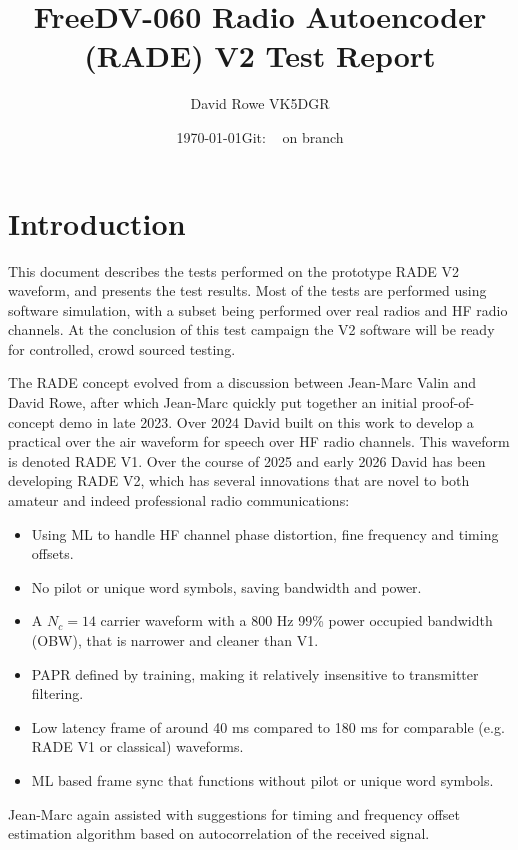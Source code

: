 \documentclass{article}
\newcommand{\commit}{\dots~(in \emph{packed-refs})}}
\newcommand{\gitrevision}{%
  \StrLeft{\commit}{7}%
}
\begin{document}


\title{FreeDV-060 Radio Autoencoder (RADE) V2 Test Report}
\author{David Rowe VK5DGR}
\date{\today \quad Git: \texttt{\gitrevision} on branch \texttt{\branch}\\}
\maketitle

\section{Introduction}

This document describes the tests performed on the prototype RADE V2 waveform, and presents the test results.  Most of the tests are performed using software simulation, with a subset being performed over real radios and HF radio channels.  At the conclusion of this test campaign the V2 software will be ready for controlled, crowd sourced testing.

The RADE concept evolved from a discussion between Jean-Marc Valin and David Rowe, after which Jean-Marc quickly put together an initial proof-of-concept demo in late 2023. Over 2024 David built on this work to develop a practical over the air waveform for speech over HF radio channels. This waveform is denoted RADE V1. 
Over the course of 2025 and early 2026 David has been developing RADE V2, which has several innovations that are novel to both amateur and indeed professional radio communications:
\begin{itemize}
\item Using ML to handle HF channel phase distortion, fine frequency and timing offsets.
\item No pilot or unique word symbols, saving bandwidth and power.
\item A $N_c=14$ carrier waveform with a 800 \si{Hz} 99\% power occupied bandwidth (OBW), that is narrower and cleaner than V1.
\item PAPR defined by training, making it relatively insensitive to transmitter filtering.
\item Low latency frame of around 40 \si{ms} compared to 180 \si{ms} for comparable (e.g. RADE V1 or classical) waveforms.
\item ML based frame sync that functions without pilot or unique word symbols.
\end{itemize}
Jean-Marc again assisted with suggestions for timing and frequency offset estimation algorithm based on autocorrelation of the received signal.
\end{document}
